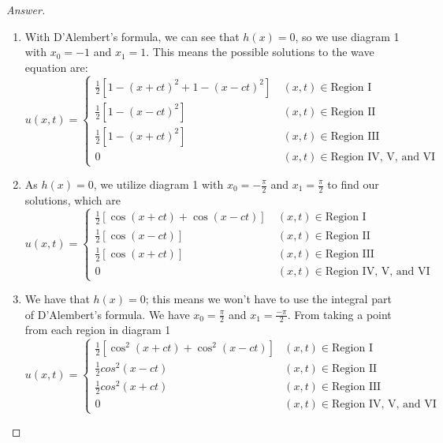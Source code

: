 \documentclass{article}
\theoremstyle{definition}
\renewcommand\qedsymbol{$\blacksquare$}
\newenvironment{ans}{\begin{proof}[Answer]\renewcommand{\qedsymbol}{}}{\end{proof}}
\begin{document}
\begin{ans}
\begin{enumerate}[(1), start = 7, resume*=answers]
    \item With D'Alembert's formula, we can see that $h(x) = 0$, so we use diagram 1 with $x_0 = -1$ and $x_1 = 1$. This means the possible solutions to the wave equation are:
    \[\boxed{u(x,t) = \begin{cases}
        \frac{1}{2} \left[ 1-(x+ct)^2 + 1-(x-ct)^2 \right]\ & (x,t)\in\text{Region I}\\
        \frac{1}{2} \left[ 1-(x-ct)^2 \right] & (x,t)\in\text{Region II}\\
        \frac{1}{2} \left[ 1-(x+ct)^2 \right] & (x,t) \in \text{Region III}\\
        0 & (x,t) \in \text{Region IV, V, and VI}
    \end{cases}}\]
    
    \item As $h(x) = 0$, we utilize diagram 1 with $x_0 = -\frac{\pi}{2}$ and $x_1 = \frac{\pi}{2}$ to find our solutions, which are
    \[\boxed{u(x,t) = \begin{cases}
        \frac{1}{2} \left[ \cos{(x+ct)} + \cos{(x-ct)} \right]\ & (x,t)\in\text{Region I}\\
        \frac{1}{2} \left[ \cos{(x-ct)} \right] & (x,t)\in\text{Region II}\\
        \frac{1}{2} \left[ \cos{(x+ct)} \right] & (x,t) \in \text{Region III}\\
        0 & (x,t) \in \text{Region IV, V, and VI}
    \end{cases}}\]

    \item We have that $h(x)=0$; this means we won't have to use the integral part of D'Alembert's formula. We have $x_0 = \frac{\pi}{2}$ and $x_1 = \frac{- \pi}{2}$. From taking a point from each region in diagram 1
    \[\boxed{u(x,t) = \begin{cases}
        \frac{1}{2} \left[ \cos^2(x+ct) + \cos^2(x-ct) \right] & (x,t)\in \text{Region I}\\
        \frac{1}{2} cos^2(x-ct) & (x,t)\in \text{Region II}\\
        \frac{1}{2} cos^2(x+ct) & (x,t)\in \text{Region III}\\
        0 & (x, t)\in \text{Region IV, V, and VI}
    \end{cases}}\]


\end{enumerate}
\end{ans}
\end{document}

